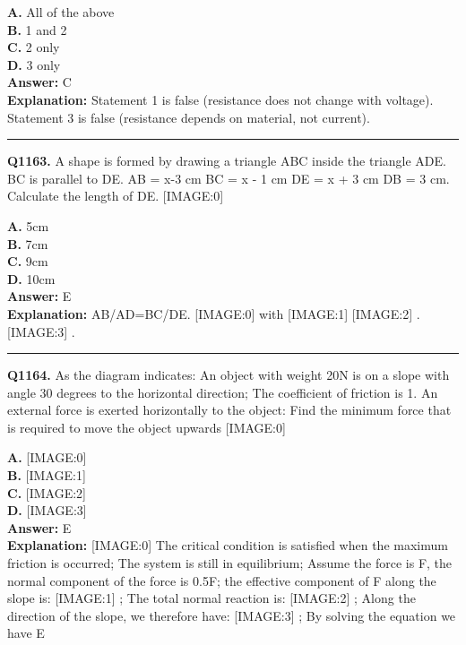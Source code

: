 \documentclass[12pt]{article}
\begin{document}
\textbf{A.} All of the above \\
\textbf{B.} 1 and 2 \\
\textbf{C.} 2 only \\
\textbf{D.} 3 only \\

\textbf{Answer:} C \\
\textbf{Explanation:} Statement 1 is false (resistance does not change with voltage). Statement 3 is false (resistance depends on material, not current).

\hrule
\vspace{1em}


\noindent
\textbf{Q1163.} A shape is formed by drawing a triangle ABC inside the triangle ADE. BC is parallel to DE. AB = x-3 cm BC = x - 1 cm DE = x + 3 cm DB = 3 cm.
Calculate the length of DE.
[IMAGE:0]



\textbf{A.} 5cm \\
\textbf{B.} 7cm \\
\textbf{C.} 9cm \\
\textbf{D.} 10cm \\

\textbf{Answer:} E \\
\textbf{Explanation:} AB/AD=BC/DE.
[IMAGE:0]
with
[IMAGE:1]
[IMAGE:2]
.
[IMAGE:3]
.

\hrule
\vspace{1em}


\noindent
\textbf{Q1164.} As the diagram indicates: An object with weight 20N is on a slope with angle 30 degrees to the horizontal direction; The coefficient of friction is 1. An external force is exerted horizontally to the object: Find the minimum force that is required to move the object upwards
[IMAGE:0]



\textbf{A.} [IMAGE:0] \\
\textbf{B.} [IMAGE:1] \\
\textbf{C.} [IMAGE:2] \\
\textbf{D.} [IMAGE:3] \\

\textbf{Answer:} E \\
\textbf{Explanation:} [IMAGE:0]
The critical condition is satisfied when the maximum friction is occurred; The system is still in equilibrium; Assume the force is F, the normal component of the force is 0.5F; the effective component of F along the slope is:
[IMAGE:1]
; The total normal reaction is:
[IMAGE:2]
; Along the direction of the slope, we therefore have:
[IMAGE:3]
; By solving the equation we have E
\end{document}
